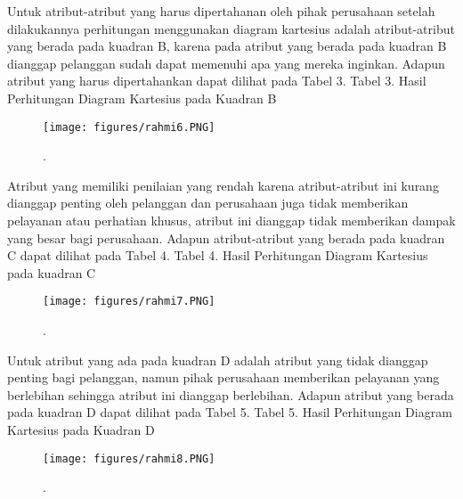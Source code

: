 Untuk atribut-atribut yang harus dipertahanan oleh pihak perusahaan setelah dilakukannya perhitungan menggunakan diagram kartesius adalah atribut-atribut
yang berada pada kuadran B, karena pada atribut yang berada pada kuadran B dianggap pelanggan sudah dapat memenuhi apa yang mereka inginkan. 
Adapun atribut yang harus dipertahankan dapat dilihat pada
Tabel 3.
Tabel 3. Hasil Perhitungan Diagram Kartesius
pada Kuadran B
\begin{figure}[ht]
	\centerline{\texttt{[image: figures/rahmi6.PNG]}}
	\caption{.}
	\label{rahmi6}
	\end{figure}

Atribut yang memiliki penilaian yang rendah karena atribut-atribut ini kurang dianggap penting oleh pelanggan dan perusahaan juga tidak memberikan pelayanan atau perhatian khusus, 
atribut ini dianggap tidak memberikan dampak yang besar bagi perusahaan.
Adapun atribut-atribut yang berada pada kuadran C dapat dilihat pada Tabel 4.
Tabel 4. Hasil Perhitungan Diagram Kartesius pada kuadran C
\begin{figure}[ht]
	\centerline{\texttt{[image: figures/rahmi7.PNG]}}
	\caption{.}
	\label{rahmi7}
	\end{figure}

Untuk atribut yang ada pada kuadran D adalah atribut yang tidak dianggap penting bagi pelanggan, namun pihak perusahaan memberikan pelayanan yang berlebihan 
sehingga atribut ini dianggap berlebihan.
Adapun atribut yang berada pada kuadran D dapat dilihat pada Tabel 5.
Tabel 5. Hasil Perhitungan Diagram Kartesius
pada Kuadran D	
\begin{figure}[ht]
	\centerline{\texttt{[image: figures/rahmi8.PNG]}}
	\caption{.}
	\label{rahmi8}
	\end{figure}


